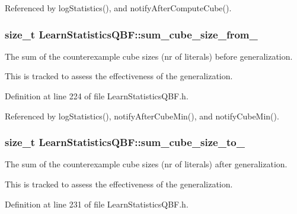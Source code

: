 Referenced by log\-Statistics(), and notify\-After\-Compute\-Cube().

\hypertarget{classLearnStatisticsQBF_a46277893a5465fb97805624e1ac31f38}{
\subsubsection[{sum\-\_\-cube\-\_\-size\-\_\-from\-\_\-}]{\setlength{\rightskip}{0pt plus 5cm}size\-\_\-t Learn\-Statistics\-Q\-B\-F\-::sum\-\_\-cube\-\_\-size\-\_\-from\-\_\-\hspace{0.3cm}{\ttfamily [protected]}}}\label{classLearnStatisticsQBF_a46277893a5465fb97805624e1ac31f38}


The sum of the counterexample cube sizes (nr of literals) before generalization. 

This is tracked to assess the effectiveness of the generalization. 

Definition at line 224 of file Learn\-Statistics\-Q\-B\-F.\-h.



Referenced by log\-Statistics(), notify\-After\-Cube\-Min(), and notify\-Cube\-Min().

\hypertarget{classLearnStatisticsQBF_a444ff1c70c90edfd87a56790060c0aae}{
\subsubsection[{sum\-\_\-cube\-\_\-size\-\_\-to\-\_\-}]{\setlength{\rightskip}{0pt plus 5cm}size\-\_\-t Learn\-Statistics\-Q\-B\-F\-::sum\-\_\-cube\-\_\-size\-\_\-to\-\_\-\hspace{0.3cm}{\ttfamily [protected]}}}\label{classLearnStatisticsQBF_a444ff1c70c90edfd87a56790060c0aae}


The sum of the counterexample cube sizes (nr of literals) after generalization. 

This is tracked to assess the effectiveness of the generalization. 

Definition at line 231 of file Learn\-Statistics\-Q\-B\-F.\-h.



